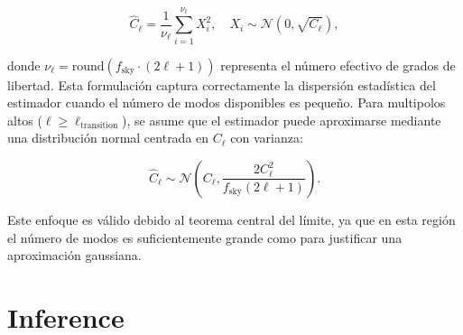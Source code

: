 \documentclass[11pt]{article}
\begin{document}
\begin{equation}
\hat{C}_\ell = \frac{1}{\nu_\ell} \sum_{i=1}^{\nu_\ell} X_i^2, \quad X_i \sim \mathcal{N}(0, \sqrt{C_\ell}),
\end{equation}

donde \(\nu_\ell = \text{round}(f_{\text{sky}} \cdot (2\ell + 1))\) representa el número efectivo de grados de libertad. Esta formulación captura correctamente la dispersión estadística del estimador cuando el número de modos disponibles es pequeño. Para multipolos altos (\(\ell \geq \ell_{\text{transition}}\)), se asume que el estimador puede aproximarse mediante una distribución normal centrada en \(C_\ell\) con varianza:

\begin{equation}
\hat{C}_\ell \sim \mathcal{N}\left(C_\ell, \frac{2 C_\ell^2}{f_{\text{sky}} (2\ell + 1)} \right).
\end{equation}

Este enfoque es válido debido al teorema central del límite, ya que en esta región el número de modos es suficientemente grande como para justificar una aproximación gaussiana.

\section{Inference}
\end{document}
